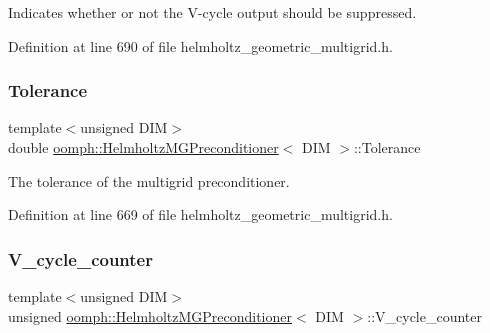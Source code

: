 Indicates whether or not the V-\/cycle output should be suppressed. 



Definition at line 690 of file helmholtz\+\_\+geometric\+\_\+multigrid.\+h.

\mbox{\label{classoomph_1_1HelmholtzMGPreconditioner_a3d152eb2679cab29ae536c5016111e38}} 
\subsubsection{\texorpdfstring{Tolerance}{Tolerance}}
{\footnotesize\ttfamily template$<$unsigned D\+IM$>$ \\
double \hyperlink{classoomph_1_1HelmholtzMGPreconditioner}{oomph\+::\+Helmholtz\+M\+G\+Preconditioner}$<$ D\+IM $>$\+::Tolerance\hspace{0.3cm}{\ttfamily [private]}}



The tolerance of the multigrid preconditioner. 



Definition at line 669 of file helmholtz\+\_\+geometric\+\_\+multigrid.\+h.

\mbox{\label{classoomph_1_1HelmholtzMGPreconditioner_ae7ebf565efd370c075ad22688bc2b288}} 
\subsubsection{\texorpdfstring{V\+\_\+cycle\+\_\+counter}{V\_cycle\_counter}}
{\footnotesize\ttfamily template$<$unsigned D\+IM$>$ \\
unsigned \hyperlink{classoomph_1_1HelmholtzMGPreconditioner}{oomph\+::\+Helmholtz\+M\+G\+Preconditioner}$<$ D\+IM $>$\+::V\+\_\+cycle\+\_\+counter\hspace{0.3cm}{\ttfamily [private]}}



